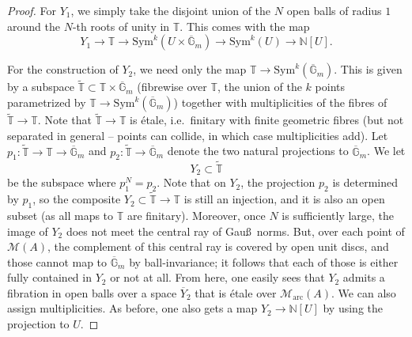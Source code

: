 \documentclass[11pt]{amsart}
\numberwithin{equation}{section}
\numberwithin{theorem}{section}
\theoremstyle{definition}
\begin{document}
\begin{proof}
For $Y_1$, we simply take the disjoint union of the $N$ open balls of radius $1$ around the $N$-th roots of unity in $\mathbb T$. This comes with the map
\[
Y_1\to \mathbb T\to \mathrm{Sym}^k(U\times \overline{\mathbb G}_m)\to \mathrm{Sym}^k(U)\to \mathbb N[U].
\]

For the construction of $Y_2$, we need only the map $\mathbb T\to \mathrm{Sym}^k(\overline{\mathbb G}_m)$. This is given by a subspace $\tilde{\mathbb T}\subset \mathbb T\times \overline{\mathbb G}_m$ (fibrewise over $\mathbb T$, the union of the $k$ points parametrized by $\mathbb T\to \mathrm{Sym}^k(\overline{\mathbb G}_m)$) together with multiplicities of the fibres of $\tilde{\mathbb T}\to \mathbb T$. Note that $\tilde{\mathbb T}\to \mathbb T$ is \'etale, i.e.~finitary with finite geometric fibres (but not separated in general -- points can collide, in which case multiplicities add). Let $p_1: \tilde{\mathbb T}\to \mathbb T\to \overline{\mathbb G}_m$ and $p_2: \tilde{\mathbb T}\to \overline{\mathbb G}_m$ denote the two natural projections to $\overline{\mathbb G}_m$. We let
\[
Y_2\subset \tilde{\mathbb T}
\]
be the subspace where $p_1^N=p_2$. Note that on $Y_2$, the projection $p_2$ is determined by $p_1$, so the composite $Y_2\subset \tilde{\mathbb T}\to \mathbb T$ is still an injection, and it is also an open subset (as all maps to $\mathbb T$ are finitary). Moreover, once $N$ is sufficiently large, the image of $Y_2$ does not meet the central ray of Gau\ss\ norms. But, over each point of $\mathcal M(A)$, the complement of this central ray is covered by open unit discs, and those cannot map to $\overline{\mathbb G}_m$ by ball-invariance; it follows that each of those is either fully contained in $Y_2$ or not at all. From here, one easily sees that $Y_2$ admits a fibration in open balls over a space $\overline{Y}_2$ that is \'etale over $\mathcal M_{\mathrm{arc}}(A)$. We can also assign multiplicities. As before, one also gets a map $Y_2\to \mathbb N[U]$ by using the projection to $U$.


\end{proof}
\end{document}
